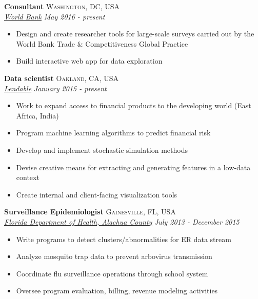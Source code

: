 \documentclass[11pt]{article}
\begin{document}
\noindent \textbf{Consultant} \hfill \textsc{Washington, DC, USA}\\
\noindent \emph{\href{http://www.worldbank.org/}{World Bank}} \hfill \emph{May 2016 - present}
\vspace{-2mm}
\begin{itemize}\itemsep0pt \parskip0pt 
\item Design and create researcher tools for large-scale surveys carried out by the World Bank Trade & Competitiveness Global Practice
\item Build interactive web app for data exploration
\end{itemize}

\noindent \textbf{Data scientist} \hfill \textsc{Oakland, CA, USA}\\
\noindent \emph{\href{http://lendable.io}{Lendable}} \hfill \emph{January 2015 - present}
\vspace{-2mm}
\begin{itemize}\itemsep0pt \parskip0pt 
\item Work to expand access to financial products to the developing world (East Africa, India)
\item Program machine learning algorithms to predict financial risk
\item Develop and implement stochastic simulation methods 
\item Devise creative means for extracting and generating features in a low-data context 
\item Create internal and client-facing visualization tools
\end{itemize}


\noindent \textbf{Surveillance Epidemiologist} \hfill \textsc{Gainesville, FL, USA}\\
\noindent \emph{\href{http://alachua.floridahealth.gov/}{Florida Department of Health, Alachua County}} \hfill \emph{July 2013 - December 2015}
\vspace{-2mm}
\begin{itemize}\itemsep0pt \parskip0pt 
\item Write programs to detect clusters/abnormalities for ER data stream
\item Analyze mosquito trap data to prevent arbovirus transmission
\item Coordinate flu surveillance operations through school system
\item Oversee program evaluation, billing, revenue modeling activities
\end{itemize}
\end{document}
